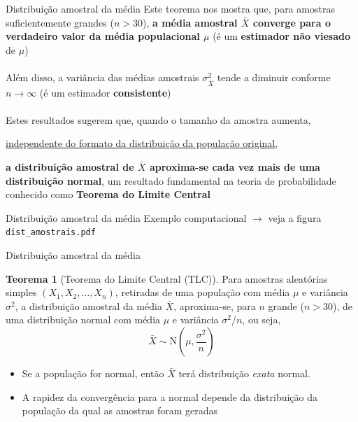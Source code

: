 \documentclass[10pt]{beamer}\usepackage[]{graphicx}\usepackage[]{color}
\theoremstyle{definition}
\newtheorem*{mythm}{Teorema}
\begin{document}
\begin{frame}[fragile=singleslide]{Distribuição amostral da média}
  Este teorema nos mostra que, para amostras suficientemente grandes ($n
  > 30$), \textbf{a média amostral $\bar{X}$  converge para o verdadeiro
  valor da média populacional $\mu$} (é um \textbf{estimador
  não viesado} de $\mu$) \\~\\
  Além disso, a variância das médias amostrais $\sigma^2_{\bar{X}}$
  tende a diminuir conforme $n \rightarrow \infty$ (é um estimador
  \textbf{consistente}) \\~\\
  Estes resultados sugerem que, quando o tamanho da amostra aumenta,
  \begin{center}
  \underline{independente do formato da distribuição da população
    original},
  \end{center}
  \textbf{a distribuição amostral de $\bar{X}$ aproxima-se
    cada vez mais de uma distribuição normal}, um resultado fundamental
  na teoria de probabilidade conhecido como \textbf{Teorema do Limite Central}
\end{frame}

\begin{frame}{Distribuição amostral da média}
Exemplo computacional $\rightarrow$ veja a figura
\texttt{dist\_amostrais.pdf}
\end{frame}

\begin{frame}[fragile=singleslide]{Distribuição amostral da média}
  \begin{mythm}[Teorema do Limite Central (TLC)]
    Para amostras aleatórias simples $(X_1, X_2, \ldots, X_n)$,
    retiradas de uma população com média $\mu$ e variância
    $\sigma^2$, a distribuição amostral da média $\bar{X}$,
    aproxima-se, para $n$ grande ($n>30$), de uma distribuição normal
    com média $\mu$ e variância $\sigma^2/n$, ou seja,
  \begin{equation*}
    \bar{X} \sim \text{N}\left(\mu, \frac{\sigma^2}{n} \right)
  \end{equation*}
  \end{mythm}
  \begin{itemize}
  \item Se a população for normal, então $\bar{X}$ terá distribuição
    \textit{exata} normal.
  \item A rapidez da convergência para a normal depende da distribuição
    da população da qual as amostras foram geradas
  \end{itemize}
\end{frame}
\end{document}
